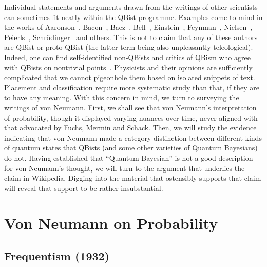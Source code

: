 \documentclass[aps,pra,superscriptaddress,12pt,tightenlines,nofootinbib]{revtex4}
\begin{document}
Individual statements and arguments drawn from the writings of other
scientists can sometimes fit neatly within the QBist programme.
Examples come to mind in the works of Aaronson~\cite[pp.\ xii--xiii,
  110]{Aaronson2013}, Bacon~\cite{Bacon2005}, Baez~\cite{Baez2003},
Bell~\cite{Mermin-Vienna, Mermin-Bell}, Einstein~\cite{Fuchs2014b},
Feynman~\cite[p.\ 6\,-7]{FeynmanLP}, Nielsen~\cite{Nielsen2004b},
Peierls~\cite{Mermin-Bell}, Schr\"odinger~\cite{Mermin14,
  Mermin-Vienna, Mermin-Bell} and others.  This is not to claim that
any of these authors are QBist or proto-QBist (the latter term being
also unpleasantly teleological).  Indeed, one can find self-identified
non-QBists and critics of QBism who agree with QBists on nontrivial
points~\cite{Moldoveanu2015, Brukner2015}.  Physicists and their
opinions are sufficiently complicated that we cannot pigeonhole them
based on isolated snippets of text.  Placement and classification
require more systematic study than that, if they are to have any
meaning.  With this concern in mind, we turn to surveying the writings
of von Neumann.  First, we shall see that von Neumann's interpretation
of probability, though it displayed varying nuances over time, never
aligned with that advocated by Fuchs, Mermin and Schack.  Then, we
will study the evidence indicating that von Neumann made a category
distinction between different kinds of quantum states that QBists (and
some other varieties of Quantum Bayesians) do not.  Having established
that ``Quantum Bayesian'' is not a good description for von Neumann's
thought, we will turn to the argument that underlies the claim in
Wikipedia.  Digging into the material that ostensibly supports that
claim will reveal that support to be rather insubstantial.


\section{Von Neumann on Probability}

\subsection{Frequentism (1932)}
\end{document}
